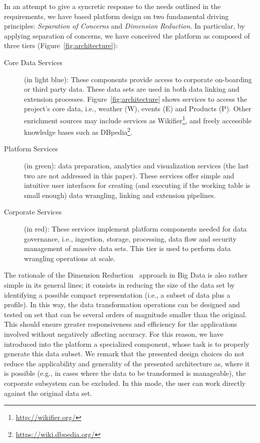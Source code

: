 In an attempt to give a syncretic response to the needs outlined in the requirements, we have based platform design on two fundamental driving principles:  \textit{Separation of Concerns} and \textit{Dimension Reduction}.  
In particular, by applying separation of concerns, we have conceived the platform as composed of three tiers (Figure~\ref{fig:architecture}):

\begin{description}
    \item[Core Data Services] (in light blue): These components provide access to corporate on-boarding or third party data. These data sets are used in both data linking and extension processes. Figure~\ref{fig:architecture} shows services to access the project's core data, i.e., weather (W), events (E) and Products (P). Other enrichment sources may include services as Wikifier\footnote{\url{http://wikifier.org/}}, and freely accessible knowledge bases such as DBpedia\footnote{\url{https://wiki.dbpedia.org/}}.
    \item[Platform Services] (in green): data preparation, analytics and visualization services (the last two are not addressed in this paper). These services offer simple and intuitive user interfaces for creating (and executing if the working table is small enough) data wrangling, linking and extension pipelines.
    \item[Corporate Services] (in red): These services implement platform components needed for data governance, i.e., ingestion, storage, processing, data flow and security management of massive data sets. This tier is used to perform data wrangling operations at scale. 
\end{description}


The rationale of the Dimension Reduction~\cite{rojas2017sampling, ur2016big} approach in Big Data is also rather simple in its general lines; it consists in reducing the size of the data set by identifying a possible compact representation (i.e., a subset of data plus a profile). In this way, the data transformation operations can be designed and tested on set that can be several orders of magnitude smaller than the original. This should ensure greater responsiveness and efficiency for the applications involved without negatively affecting accuracy. For this reason, we have introduced into the platform a specialized component, whose task is to properly generate this data subset. 
We remark that the presented design choices do not reduce the applicability and generality of the presented architecture as, where it is possible (e.g., in cases where the data to be transformed is manageable), the corporate subsystem can be excluded. In this mode, the user can work directly against the original data set.


